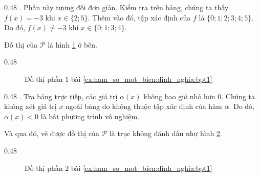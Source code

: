 {
   \begin{minipageindent}{0.48\textwidth}
      \setcounter{subexercise}{1}
      . Phần này tương đối đơn giản. Kiểm tra trên bảng, chúng ta thấy $f(x) = -3$ khi $x \in \{2; 5\}$. Thêm vào đó, tập xác định của $f$ là $\{0; 1; 2; 3; 4; 5\}$. Do đó, $f(x) \neq -3$ khi $x \in \{0; 1; 3; 4\}$. 

      Đồ thị của $\mathcal{P}$ là hình \ref{fig:ham_so_mot_bien:dinh_nghia:bpt1} ở bên.
   \end{minipageindent}
   \begin{minipageindent}{0.48\textwidth}
      \begin{figure}[H]
         \centering
         \caption{Đồ thị phần 1 bài \ref{ex:ham_so_mot_bien:dinh_nghia:bpt1}}
         \label{fig:ham_so_mot_bien:dinh_nghia:bpt1}
      \end{figure}
   \end{minipageindent}
}

{
   \begin{minipageindent}{0.48\textwidth}
      . Tra bảng trực tiếp, các giá trị $\alpha(x)$ không bao giờ nhỏ hơn $0$. Chúng ta không xét giá trị $x$ ngoài bảng do không thuộc tập xác định của hàm $\alpha$. Do đó, $\alpha(x) < 0$ là bất phương trình vô nghiệm.

      Và qua đó, vẽ được đồ thị của $\mathcal{P}$ là trục không đánh dấu như hình \ref{fig:ham_so_mot_bien:dinh_nghia:bpt2}.
   \end{minipageindent}
   \begin{minipageindent}{0.48\textwidth}
      \begin{figure}[H]
         \centering
         \caption{Đồ thị phần 2 bài \ref{ex:ham_so_mot_bien:dinh_nghia:bpt1}}
         \label{fig:ham_so_mot_bien:dinh_nghia:bpt2}
      \end{figure}
   \end{minipageindent}
}

